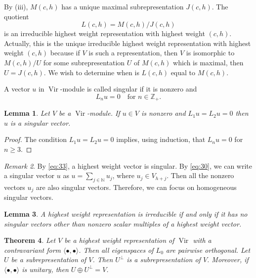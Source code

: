 \documentclass[a4paper, 12pt, reqno]{amsart}
\newtheorem{theorem}{Theorem}[section]
\newtheorem{lemma}[theorem]{Lemma}
\theoremstyle{remark}
\newtheorem{remark}[theorem]{Remark}
\numberwithin{equation}{subsection}
\DeclareMathOperator{\Vir}{Vir}
\begin{document}
By (iii), $M(c, h)$ has a unique maximal subrepresentation $J(c, h)$.
The quotient
\begin{equation*}
  L(c, h) = M(c, h)/J(c, h)
\end{equation*}
is an irreducible highest weight representation with highest weight $(c, h)$.
Actually, this is the unique irreducible highest weight representation with highest weight $(c, h)$ because if $V$ is such a representation, then $V$ is isomorphic to $M(c, h)/U$ for some subrepresentation $U$ of $M(c, h)$ which is maximal, then $U = J(c, h)$.
We wish to determine when is $L(c, h)$ equal to $M(c, h)$.

A vector $u$ in $\Vir$-module is called singular if it is nonzero and
\begin{equation}
  \label{eq:35}
  L_nu = 0 \quad \text{for }n \in \mathbb{Z}_+.
\end{equation}

\begin{lemma}
  \label{lmm:17}
  Let $V$ be a $\Vir$-module.
  If $u \in V$ is nonzero and $L_1u = L_2u = 0$ then $u$ is a singular vector. 
\end{lemma}

\begin{proof}
  The condition $L_1u = L_2u = 0$ implies, using induction, that $L_nu = 0$ for $n \ge 3$.
\end{proof}

\begin{remark}
  \label{rmk:23}
  By \eqref{eq:33}, a highest weight vector is singular. 
  By \eqref{eq:30}, we can  write a singular vector $u$ as $u = \sum_{j \in \mathbb{N}}u_j$, where $u_j \in V_{h + j}$.
  Then all the nonzero vectors $u_j$ are also singular vectors.
  Therefore, we can focus on homogeneous singular vectors.
\end{remark}

\begin{lemma}
  \label{lmm:18}
  A highest weight representation is irreducible if and only if it has no singular vectors other than nonzero scalar multiples of a highest weight vector.
\end{lemma}

\begin{theorem}
  \label{thr:30}
  Let $V$ be a highest weight representation of $\Vir$ with a contravariant form $\langle \bullet, \bullet\rangle$.
  Then all eigenspaces of $L_0$ are pairwise orthogonal.
  Let $U$ be a subrepresentation of $V$.
  Then $U^\perp$ is a subrepresentation of $V$.
  Moreover, if $\langle \bullet, \bullet\rangle$ is unitary, then $U\oplus U^\perp=V$.
\end{theorem}
\end{document}
